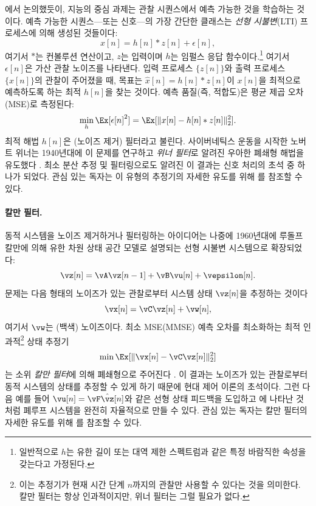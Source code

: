 \documentclass[../../book-main_ko.tex]{subfiles}
\begin{document}
에서 논의했듯이, 지능의 중심 과제는 관찰 시퀀스에서 예측 가능한 것을 학습하는 것이다. 예측 가능한 시퀀스---또는 신호---의 가장 간단한 클래스는 \textit{선형 시불변}(LTI) 프로세스에 의해 생성된 것들이다:
\begin{equation}
    x[n] = h[n]*z[n] + \epsilon[n],
    \label{eqn:Wiener-model}
\end{equation}
여기서 \(*\)는 컨볼루션 연산이고, \(z\)는 입력이며 \(h\)는 임펄스 응답 함수이다.\footnote{일반적으로 \(h\)는 유한 길이 또는 대역 제한 스펙트럼과 같은 특정 바람직한 속성을 갖는다고 가정된다.} 여기서 \(\epsilon[n]\)은 가산 관찰 노이즈를 나타낸다. 입력 프로세스 \(\{z[n]\}\)와 출력 프로세스 \(\{x[n]\}\)의 관찰이 주어졌을 때, 목표는 \(\hat{x}[n] = h[n]*z[n]\)이 \(x[n]\)을 최적으로 예측하도록 하는 최적 \(h[n]\)을 찾는 것이다. 예측 품질(즉, 적합도)은 평균 제곱 오차(MSE)로 측정된다:
\begin{equation}
    \min_{h} \Ex[\epsilon[n]^{2}] = \Ex[\|x[n] - h[n]*z[n]\|_{2}^{2}].
    \label{eqn:wiener-mse}
\end{equation}
최적 해법 \(h[n]\)은 (노이즈 제거) 필터라고 불린다. 사이버네틱스 운동을 시작한 노버트 위너는 1940년대에 이 문제를 연구하고 \textit{위너 필터}로 알려진 우아한 폐쇄형 해법을 유도했다 \cite{Wiener-1942,Wiener-1949}. 최소 분산 추정 및 필터링으로도 알려진 이 결과는 신호 처리의 초석 중 하나가 되었다. 관심 있는 독자는 이 유형의 추정기의 자세한 유도를 위해 \cite[Appendix B]{MaY2003}를 참조할 수 있다.

\paragraph{칼만 필터.}
동적 시스템을 노이즈 제거하거나 필터링하는 아이디어는 나중에 1960년대에 루돌프 칼만에 의해 유한 차원 상태 공간 모델로 설명되는 선형 시불변 시스템으로 확장되었다:
\begin{equation}
    \vz[n] = \vA \vz[n-1] + \vB\vu[n] + \vepsilon[n].
    \label{eqn:linear-state-space}
\end{equation}
문제는 다음 형태의 노이즈가 있는 관찰로부터 시스템 상태 \(\vz[n]\)을 추정하는 것이다
\begin{equation}
    \vx[n] = \vC \vz[n] + \vw[n],
    \label{eqn:Kalman-model}
\end{equation}
여기서 \(\vw\)는 (백색) 노이즈이다. 최소 MSE(MMSE) 예측 오차를 최소화하는 최적 인과적\footnote{이는 추정기가 현재 시간 단계 \(n\)까지의 관찰만 사용할 수 있다는 것을 의미한다. 칼만 필터는 항상 인과적이지만, 위너 필터는 그럴 필요가 없다.} 상태 추정기
\begin{equation}
    \min \Ex[ \|\vx[n] - \vC\vz[n]\|_{2}^{2}]
    \label{eqn:kalman-mse}
\end{equation}
는 소위 \textit{칼만 필터}에 의해 폐쇄형으로 주어진다 \cite{kalman1960new}. 이 결과는 노이즈가 있는 관찰로부터 동적 시스템의 상태를 추정할 수 있게 하기 때문에 현대 제어 이론의 초석이다. 그런 다음 예를 들어 \(\vu[n] = \vF \hat{\vz}[n]\)와 같은 선형 상태 피드백을 도입하고 에 나타난 것처럼 폐루프 시스템을 완전히 자율적으로 만들 수 있다. 관심 있는 독자는 칼만 필터의 자세한 유도를 위해 \cite[Appendix B]{MaY2003}를 참조할 수 있다.
\end{document}
